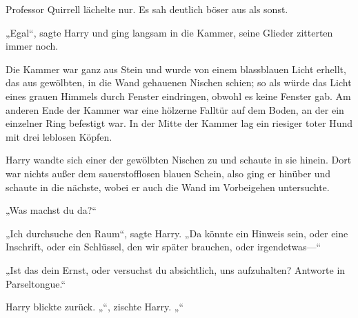 Professor Quirrell lächelte nur. Es sah deutlich böser aus als sonst.

„Egal“, sagte Harry und ging langsam in die Kammer, seine Glieder zitterten immer noch.

Die Kammer war ganz aus Stein und wurde von einem blassblauen Licht erhellt, das aus gewölbten, in die Wand gehauenen Nischen schien; so als würde das Licht eines grauen Himmels durch Fenster eindringen, obwohl es keine Fenster gab. Am anderen Ende der Kammer war eine hölzerne Falltür auf dem Boden, an der ein einzelner Ring befestigt war. In der Mitte der Kammer lag ein riesiger toter Hund mit drei leblosen Köpfen.

Harry wandte sich einer der gewölbten Nischen zu und schaute in sie hinein. Dort war nichts außer dem sauerstofflosen blauen Schein, also ging er hinüber und schaute in die nächste, wobei er auch die Wand im Vorbeigehen untersuchte.

„Was machst du da?“

„Ich durchsuche den Raum“, sagte Harry. „Da könnte ein Hinweis sein, oder eine Inschrift, oder ein Schlüssel, den wir später brauchen, oder irgendetwas—“

„Ist das dein Ernst, oder versuchst du absichtlich, uns aufzuhalten? Antworte in Parseltongue.“

Harry blickte zurück.
„“, zischte Harry. „“

